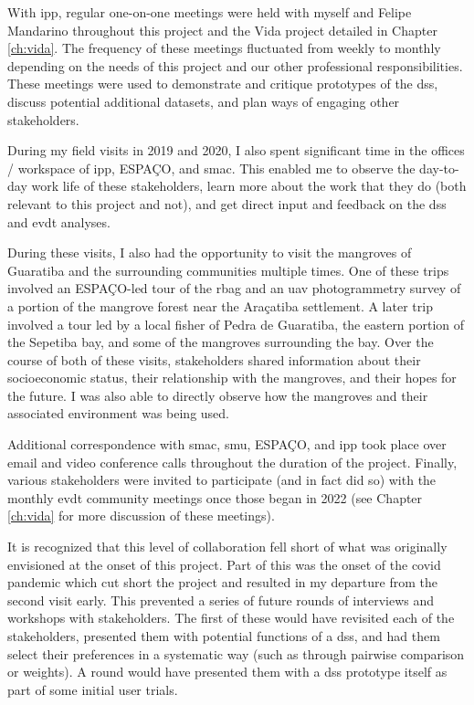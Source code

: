 With \ac{ipp}, regular one-on-one meetings were held with myself and Felipe Mandarino throughout this project and the Vida project detailed in Chapter \ref{ch:vida}. The frequency of these meetings fluctuated from weekly to monthly depending on the needs of this project and our other professional responsibilities. These meetings were used to demonstrate and critique prototypes of the \ac{dss}, discuss potential additional datasets, and plan ways of engaging other stakeholders.

During my field visits in 2019 and 2020, I also spent significant time in the offices / workspace of \ac{ipp}, ESPAÇO, and \ac{smac}. This enabled me to observe the day-to-day work life of these stakeholders, learn more about the work that they do (both relevant to this project and not), and get direct input and feedback on the \ac{dss} and \ac{evdt} analyses. 

During these visits, I also had the opportunity to visit the mangroves of Guaratiba and the surrounding communities multiple times. One of these trips involved an ESPAÇO-led tour of the \ac{rbag} and an \ac{uav} photogrammetry survey of a portion of the mangrove forest near the Araçatiba settlement. A later trip involved a tour led by a local fisher of Pedra de Guaratiba, the eastern portion of the Sepetiba bay, and some of the mangroves surrounding the bay. Over the course of both of these visits, stakeholders shared information about their socioeconomic status, their relationship with the mangroves, and their hopes for the future. I was also able to directly observe how the mangroves and their associated environment was being used.

Additional correspondence with \ac{smac}, \ac{smu}, ESPAÇO, and \ac{ipp} took place over email and video conference calls throughout the duration of the project. Finally, various stakeholders were invited to participate (and in fact did so) with the monthly \ac{evdt} community meetings once those began in 2022 (see Chapter \ref{ch:vida} for more discussion of these meetings). 

It is recognized that this level of collaboration fell short of what was originally envisioned at the onset of this project. Part of this was the onset of the \ac{covid} pandemic which cut short the project and resulted in my departure from the second visit early. This prevented a series of future rounds of interviews and workshops with stakeholders. The first of these would have revisited each of the stakeholders, presented them with potential functions of a \ac{dss}, and had them select their preferences in a systematic way (such as through pairwise comparison or weights). A round would have presented them with a \ac{dss} prototype itself as part of some initial user trials.

